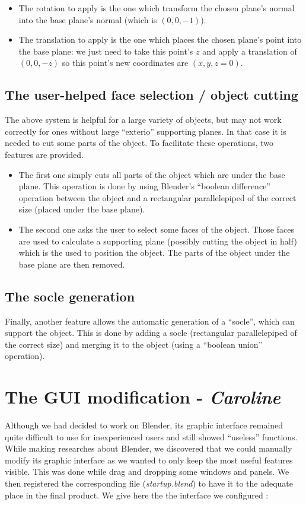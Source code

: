 \documentclass{report}
\begin{document}
\begin{itemize}
\item The rotation to apply is the one which transform the chosen plane’s normal into the base plane’s normal (which is $(0, 0, -1)$).
\item The translation to apply is the one which places the chosen plane’s point into the base plane: we just need to take this point’s $z$ and apply a translation of $(0, 0, -z)$ so this point’s new coordinates are $(x, y, z=0)$.
\end{itemize}

\subsection{The user-helped face selection / object cutting}
The above system is helpful for a large variety of objects, but may not work correctly for ones without large ``exterio'' supporting planes. In that case it is needed to cut some parts of the object. To facilitate these operations, two features are provided.
\begin{itemize}
\item The first one simply cuts all parts of the object which are under the base plane. This operation is done by using Blender’s ``boolean difference'' operation between the object and a rectangular parallelepiped of the correct size (placed under the base plane).
\item The second one asks the user to select some faces of the object. Those faces are used to calculate a supporting plane (possibly cutting the object in half) which is the used to position the object. The parts of the object under the base plane are then removed.
\end{itemize}

\subsection{The socle generation}
Finally, another feature allows the automatic generation of a ``socle'', which can support the object. This is done by adding a socle (rectangular parallelepiped of the correct size) and merging it to the object (using a ``boolean union'' operation).

\section{The GUI modification - \textit{Caroline}}

Although we had decided to work on Blender, its graphic interface remained quite difficult to use for inexperienced users and still showed ``useless'' functions. \\
While making researches about Blender, we discovered that we could manually modify its graphic interface as we wanted to only keep the most useful features visible. This was done while drag 	and dropping some windows and panels. We then registered the corresponding file (\textit{startup.blend}) to have it to the adequate place in the final product. We give here the the interface we configured :
\end{document}
